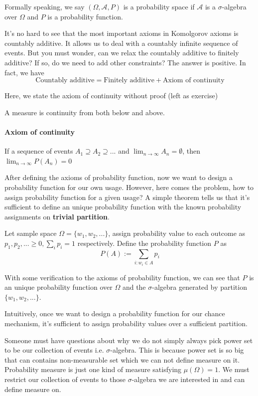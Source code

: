 \documentclass[../Probability_Theory.tex]{subfiles}
\begin{document}
Formally speaking, we say $(\Omega,\mathcal{A},P)$ is a probability space if $\mathcal{A}$ is a $\sigma$-algebra over $\Omega$ and $P$ is a probability function.

It's no hard to see that the most important axioms in Komolgorov axioms is countably additive. It allows us to deal with a countably infinite sequence of events. But you must wonder, can we relax the countably additive to finitely additive? If so, do we need to add other constraints? The answer is positive. In fact, we have
$$\mbox{Countably additive} = \mbox{Finitely additive} + \mbox{Axiom of continuity}$$

Here, we state the axiom of continuity without proof (left as exercise)
\begin{remark}
A measure is continuity from both below and above.
\end{remark}
\paragraph{Axiom of continuity}
If a sequence of events $A_1\supseteq A_2\supseteq...$ and $\lim_{n\rightarrow\infty}A_n=\emptyset$, then $\lim_{n\rightarrow\infty}P(A_n)=0$

After defining the axioms of probability function, now we want to design a probability function for our own usage. However, here comes the problem, how to assign probability function for a given usage? A simple theorem tells us that it's sufficient to define an unique probability function with the known probability assignments on {\bf trivial partition}.
\begin{theorem}
	Let sample space $\Omega=\{w_1,w_2,...\}$, assign probability value to each outcome as $p_1,p_2,...\geq0, \sum_i p_i=1$ respectively. Define the probability function $P$ as
	$$P(A):=\sum_{i:w_i\in A}p_i$$
\end{theorem}
With some verification to the axioms of probability function, we can see that $P$ is an unique probability function over $\Omega$ and the $\sigma$-algebra generated by partition $\{w_1,w_2,...\}$.

Intuitively, once we want to design a probability function for our chance mechanism, it's sufficient to assign probability values over a sufficient partition.

\begin{intuition}
Someone must have questions about why we do not simply always pick power set to be our collection of events i.e. $\sigma$-algebra. This is because power set is so big that can contains non-measurable set which we can not define measure on it. Probability measure is just one kind of measure satisfying $\mu(\Omega)=1$. We must restrict our collection of events to those $\sigma$-algebra we are interested in and can define measure on. 
\end{intuition}
\end{document}
